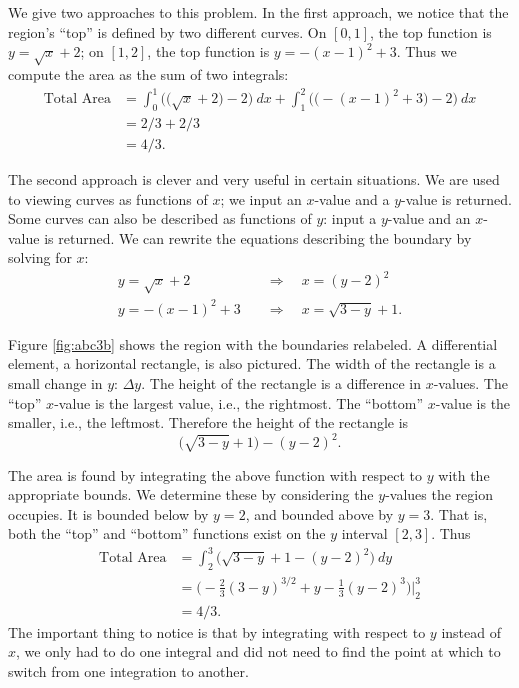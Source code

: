 {We give two approaches to this problem. In the first approach, we notice that the region's ``top'' is defined by two different curves. On $[0,1]$, the top function is $y=\sqrt{x}+2$; on $[1,2]$, the top function is $y=-(x-1)^2+3$. 
Thus we compute the area as the sum of two integrals:
\begin{align*}
	\text{Total Area}
	&= \int_0^1 \Big(\big(\sqrt{x}+2\big)-2\Big)\ dx + \int_1^2 \Big(\big(-(x-1)^2+3\big)-2\Big)\ dx \\
	&= 2/3 + 2/3\\
	&=4/3.
\end{align*}

The second approach is clever and very useful in certain situations. We are used to viewing curves as functions of $x$; we input an $x$-value and a $y$-value is returned. Some curves can also be described as functions of $y$: input a $y$-value and an $x$-value is returned. We can rewrite the equations describing the boundary by solving for $x$:
\begin{align*}
y=\sqrt{x}+2 & \quad\Rightarrow\quad x=(y-2)^2 \\
y=-(x-1)^2+3 & \quad\Rightarrow\quad x=\sqrt{3-y}+1.
\end{align*}

Figure \ref{fig:abc3b} shows the region with the boundaries relabeled. A differential element, a horizontal rectangle, is also pictured.	The width of the rectangle is a small change in $y$: $\Delta y$. The height of the rectangle is a difference in $x$-values. The ``top'' $x$-value is the largest value, i.e., the rightmost. The ``bottom'' $x$-value is the smaller, i.e., the leftmost. Therefore the height of the rectangle is
\[\big(\sqrt{3-y}+1\big) - (y-2)^2.\]

The area is found by integrating the above function with respect to $y$ with the appropriate bounds. We determine these by considering the $y$-values the region occupies. It is bounded below by $y=2$, and bounded above by $y=3$. That is, both the ``top'' and ``bottom'' functions exist on the $y$ interval $[2,3]$. Thus
\begin{align*}
	\text{Total Area}
	&= \int_2^3 \big(\sqrt{3-y}+1 - (y-2)^2\big)\ dy \\
	&= \Big(-\frac23(3-y)^{3/2}+y-\frac13(y-2)^3\Big)\Big|_2^3 \\
	&= 4/3.
\end{align*}
The important thing to notice is that by integrating with respect to $y$ instead of $x$, we only had to do one integral and did not need to find the point at which to switch from one integration to another.}

